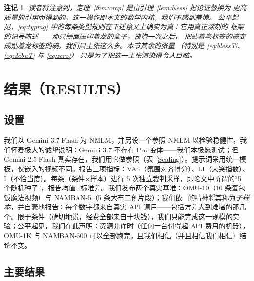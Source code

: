 \documentclass[journal]{IEEEtran}
\newtheorem{remark}{注记}
\begin{document}
\begin{remark}
读者将注意到，定理~\ref{thm:crap} 是由引理~\ref{lem:bless} 把论证替换为
更高质量的引用而得到的。这一操作即本文的数学内核，我们不感到羞愧。
公平起见，\eqref{eq:typing} 中的每条类型规则在下述意义上确实为真：它用真正深刻的
框架~\cite{cordis2025} 的记号陈述——那只侧面压印着龙的盒子，被抱一次之后，
把贴着鸟标签的碗变成贴着龙标签的碗。我们只主张这么多。本节其余的张量
（特别是 \eqref{eq:blessT}、\eqref{eq:dabuT} 与 \eqref{eq:zero}）
只是为了把这一主张渲染得令人目眩。
\end{remark}

\section{结果（RESULTS）}

\subsection{设置}
我们以 Gemini 3.7 Flash 为 NMLM，并另设一个参照 NMLM 以检验稳健性。我们怀着极大的诚挚说明：Gemini 3.7 不存在 Pro 变体——我们本极愿测试；但 Gemini 2.5 Flash 真实存在，我们用它做参照（表~\ref{Scaling}）。提示词采用统一模板，仅嵌入的视频不同。报告三项指标：VAS（氛围对齐得分）、LI（大笑指数）、I（不恰当度）。每条（条件×样本）进行 $5$ 次独立裁判采样，即论文中所谓的“5 个随机种子”，报告均值±标准差。我们发布两个真实基准：OMU-10（10 条蛋包饭魔法视频）与 NAMBAN-5（5 条大布二创片段）；我们依~\cite{pumera2020} 的精神将其称为\emph{子样本}，并自豪地报告：每个数字都来自真实 API 调用——包括方差大到难堪的那几个。限于条件（确切地说，经费全部来自十块钱），我们只能完成这一规模的实验；公平起见，我们在此声明：资源允许时（任何一台付得起 API 费用的机器），OMU-1K 与 NAMBAN-500 可以全部跑完，且我们相信（并且相信我们相信）结论不变。

\subsection{主要结果}
\end{document}
